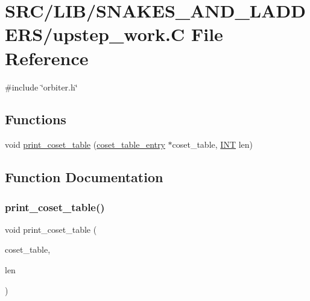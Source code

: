 \hypertarget{upstep__work_8_c}{}\section{S\+R\+C/\+L\+I\+B/\+S\+N\+A\+K\+E\+S\+\_\+\+A\+N\+D\+\_\+\+L\+A\+D\+D\+E\+R\+S/upstep\+\_\+work.C File Reference}
\label{upstep__work_8_c}
{\ttfamily \#include \char`\"{}orbiter.\+h\char`\"{}}\newline
\subsection*{Functions}
\begin{DoxyCompactItemize}
\item 
void \mbox{\hyperlink{upstep__work_8_c_a7264ade1a6b7bd1578e5f2c30732d133}{print\+\_\+coset\+\_\+table}} (\mbox{\hyperlink{structcoset__table__entry}{coset\+\_\+table\+\_\+entry}} $\ast$coset\+\_\+table, \mbox{\hyperlink{galois_8h_a09fddde158a3a20bd2dcadb609de11dc}{I\+NT}} len)
\end{DoxyCompactItemize}


\subsection{Function Documentation}
\mbox{\label{upstep__work_8_c_a7264ade1a6b7bd1578e5f2c30732d133}} 
\subsubsection{\texorpdfstring{print\+\_\+coset\+\_\+table()}{print\_coset\_table()}}
{\footnotesize\ttfamily void print\+\_\+coset\+\_\+table (\begin{DoxyParamCaption}\item[{\mbox{\hyperlink{structcoset__table__entry}{coset\+\_\+table\+\_\+entry}} $\ast$}]{coset\+\_\+table,  }\item[{\mbox{\hyperlink{galois_8h_a09fddde158a3a20bd2dcadb609de11dc}{I\+NT}}}]{len }\end{DoxyParamCaption})}

